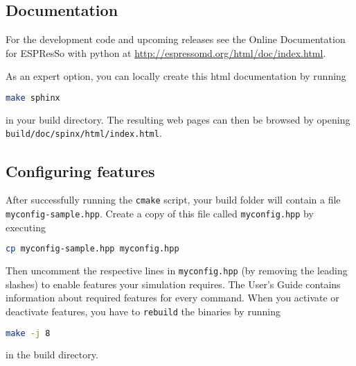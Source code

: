 \documentclass[
paper=a4,                       %
fontsize=11pt,                  %
headinclude=false,              %
footinclude=false,              %
pagesize,                       %
]{scrartcl}
\begin{document}
\subsection{Documentation}

For the development code and upcoming releases see the Online Documentation for
ESPResSo with python at \url{http://espressomd.org/html/doc/index.html}.

As an expert option, you can locally create this html documentation by running
\begin{lstlisting}[language=bash]
make sphinx
\end{lstlisting}
in your build directory. The resulting web pages can then be browsed by opening \texttt{build/doc/spinx/html/index.html}.

\subsection{Configuring features}
%
After successfully running the \verb!cmake! script, your build folder will contain a file \\ \texttt{myconfig-sample.hpp}. Create a copy of this file called \texttt{myconfig.hpp} by executing
\begin{lstlisting}[language=bash]
cp myconfig-sample.hpp myconfig.hpp
\end{lstlisting}
%
Then uncomment the respective lines in \texttt{myconfig.hpp} (by removing the leading slashes) to enable features your simulation requires. The User's Guide contains information about required features for every \es{} command.
When you activate or deactivate features, you have to \verb!rebuild! the binaries by running
%
\begin{lstlisting}[language=bash]
make -j 8
\end{lstlisting}
%
in the build directory.
\end{document}
